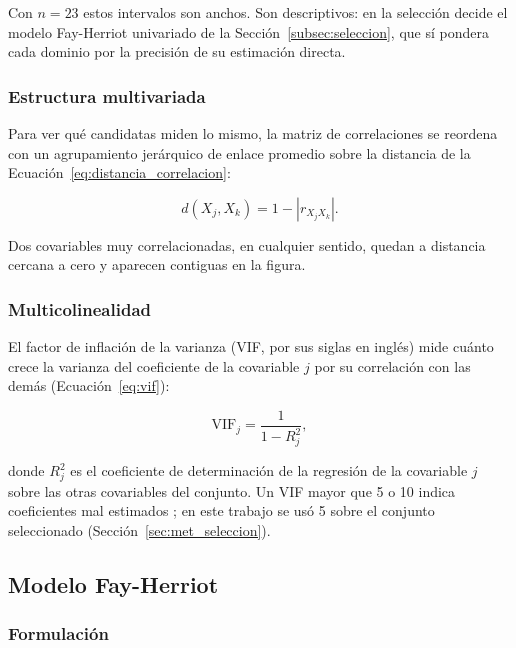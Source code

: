 Con $n = 23$ estos intervalos son anchos. Son descriptivos: en la selección decide el modelo Fay-Herriot univariado de la Sección~\ref{subsec:seleccion}, que sí pondera cada dominio por la precisión de su estimación directa.

\subsubsection{Estructura multivariada}

Para ver qué candidatas miden lo mismo, la matriz de correlaciones se reordena con un agrupamiento jerárquico de enlace promedio sobre la distancia de la Ecuación~\ref{eq:distancia_correlacion}:

\begin{equation}
    d(X_j, X_k) = 1 - \left|r_{X_j X_k}\right| .
    \label{eq:distancia_correlacion}
\end{equation}

Dos covariables muy correlacionadas, en cualquier sentido, quedan a distancia cercana a cero y aparecen contiguas en la figura.

\subsubsection{Multicolinealidad}

El factor de inflación de la varianza (VIF, por sus siglas en inglés) mide cuánto crece la varianza del coeficiente de la covariable $j$ por su correlación con las demás (Ecuación~\ref{eq:vif}):

\begin{equation}
    \text{VIF}_j = \frac{1}{1 - R_j^2},
    \label{eq:vif}
\end{equation}

donde $R_j^2$ es el coeficiente de determinación de la regresión de la covariable $j$ sobre las otras covariables del conjunto. Un VIF mayor que 5 o 10 indica coeficientes mal estimados \cite[sec.~9.4]{MontgomeryPeckVining2012}; en este trabajo se usó 5 sobre el conjunto seleccionado (Sección~\ref{sec:met_seleccion}).

\subsection{Modelo Fay-Herriot}
\label{subsec:fay-herriot}

\subsubsection{Formulación}

